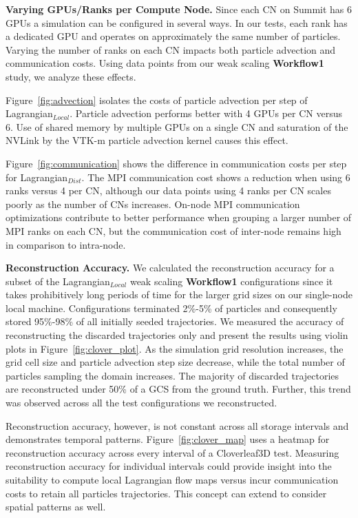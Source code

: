 \textbf{Varying GPUs/Ranks per Compute Node.}
Since each CN on Summit has 6 GPUs a simulation can be configured in several ways.
%
In our tests, each rank has a dedicated GPU and operates on approximately the same number of particles.
%
Varying the number of ranks on each CN impacts both particle advection and communication costs.
%
Using data points from our weak scaling \textbf{Workflow1} study, we analyze these effects.
%

Figure~\ref{fig:advection} isolates the costs of particle advection per step of Lagrangian$_{Local}$.
%
Particle advection performs better with 4 GPUs per CN versus 6.
%
Use of shared memory by multiple GPUs on a single CN and saturation of the NVLink by the VTK-m particle advection kernel causes this effect.
%

Figure~\ref{fig:communication} shows the difference in communication costs per step for Lagrangian$_{Dist}$.
%
The MPI communication cost shows a reduction when using 6 ranks versus 4 per CN, although our data points using 4 ranks per CN scales poorly as the number of CNs increases.
%
On-node MPI communication optimizations contribute to better performance when grouping a larger number of MPI ranks on each CN, but the communication cost of inter-node remains high in comparison to intra-node.


%
%

\textbf{Reconstruction Accuracy.}
We calculated the reconstruction accuracy for a subset of the Lagrangian$_{Local}$ weak scaling \textbf{Workflow1} configurations since it takes prohibitively long periods of time for the larger grid sizes on our single-node local machine.
%
Configurations terminated 2\%-5\% of particles and consequently stored 95\%-98\% of all initially seeded trajectories. 
%
We measured the accuracy of reconstructing the discarded trajectories only and present the results using violin plots in Figure~\ref{fig:clover_plot}.
%
As the simulation grid resolution increases, the grid cell size and particle advection step size decrease, while the total number of particles sampling the domain increases. 
%
The majority of discarded trajectories are reconstructed under 50\% of a GCS from the ground truth.
%
Further, this trend was observed across all the test configurations we reconstructed. 

Reconstruction accuracy, however, is not constant across all storage intervals and demonstrates temporal patterns.
%
%
Figure~\ref{fig:clover_map} uses a heatmap for reconstruction accuracy across every interval of a Cloverleaf3D test. 
%
Measuring reconstruction accuracy for individual intervals could provide insight into the suitability to compute local Lagrangian flow maps versus incur communication costs to retain all particles trajectories.
%
This concept can extend to consider spatial patterns as well. 

